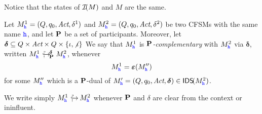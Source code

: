 Notice that the states of $\I(M)$ and $M$ are the same.

\begin{definition}
Let $M^1_\hh = (Q, q_0, \textit{Act}, \delta^1)$ and 
$M^2_\hh = (Q, q_0, \textit{Act}, \delta^2)$  
be two CFSMs with the same name $\hh$, and let $\roles$ be a set of participants.
Moreover, let $\bm{\delta} \subseteq Q\times\textit{Act}\times Q \times \Set{\intf,\nintf}$
We say that
$M^1_\hh$ is {\em $\roles$-complementary} with $M^2_\hh$ via $\bm{\delta}$, written $\emb{\roles}{\bm{\delta}}{M^1_\hh}{M^2_\hh}$, whenever 
$$M^1_\hh = \bm{\varepsilon}(M''_\hh)$$
for some $M''_\hh$ which is a $\roles$-dual of $M'_\hh= (Q, q_0, \textit{Act}, \bm{\delta})\in\IDS(M^2_\hh)$.
\end{definition}

We write simply $\emb{}{\bm{}}{M^1_\hh}{M^2_\hh}$ whenever
$\roles$ and $\delta$ are clear from the context or ininfluent.




